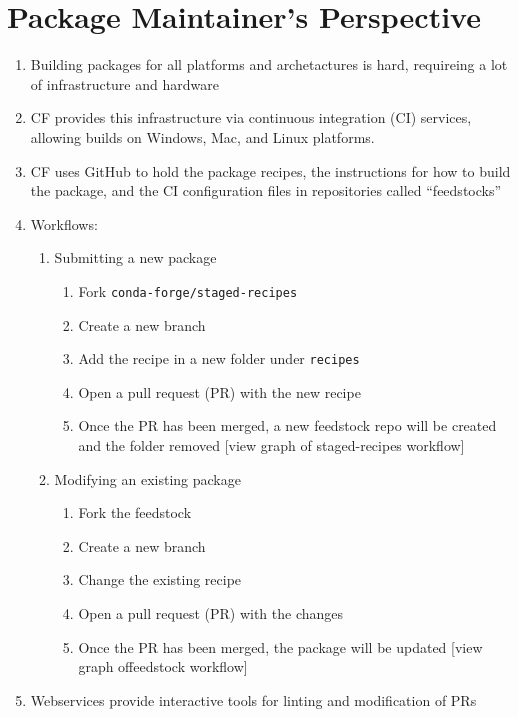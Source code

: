 \documentclass[fleqn,10pt,lineno]{wlpeerj} %
\newcommand{\sjb}[1]{\textcolor{blue}{[sjb:#1]}}
\newcounter{saveenumi}
\newcommand{\seti}{\setcounter{saveenumi}{\value{enumi}}}
\newcommand{\conti}{\setcounter{enumi}{\value{saveenumi}}}
\begin{document}
\section*{Package Maintainer's Perspective}
\begin{enumerate}\conti
\item Building packages for all platforms and archetactures is hard, requireing
a lot of infrastructure and hardware
\item CF provides this infrastructure via continuous integration (CI) services,
allowing builds on Windows, Mac, and Linux platforms.
\item CF uses GitHub to hold the package recipes, the instructions for how to 
build the package, and the CI configuration files in repositories called ``feedstocks''
\item Workflows:
\begin{enumerate}
    \item Submitting a new package
        \begin{enumerate}
            \item Fork \texttt{conda-forge/staged-recipes}
            \item Create a new branch
            \item Add the recipe in a new folder under \texttt{recipes}
            \item Open a pull request (PR) with the new recipe
            \item Once the PR has been merged, a new feedstock repo
                will be created and the folder removed
[view graph of staged-recipes workflow]
        \end{enumerate}
    \item Modifying an existing package
        \begin{enumerate}
            \item Fork the feedstock
            \item Create a new branch
            \item Change the existing recipe
            \item Open a pull request (PR) with the changes
            \item Once the PR has been merged, the package will be updated
[view graph offeedstock workflow]
        \end{enumerate}
\end{enumerate}
\item Webservices provide interactive tools for linting and modification of PRs
\end{enumerate}\seti
\end{document}
